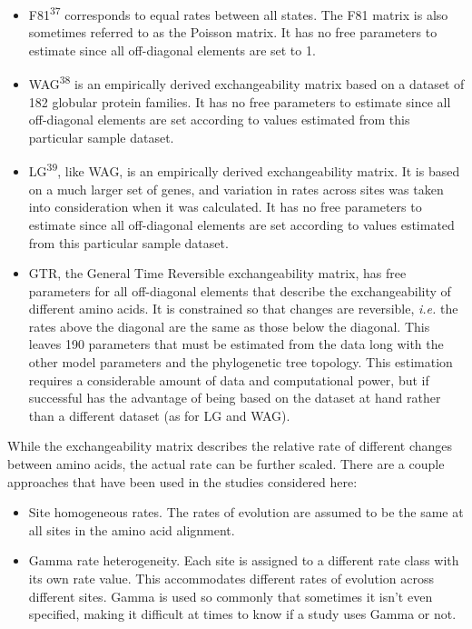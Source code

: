 \documentclass[]{article}
\begin{document}
\begin{itemize}
\item
  F81\textsuperscript{37} corresponds to equal rates between all states.
  The F81 matrix is also sometimes referred to as the Poisson matrix. It
  has no free parameters to estimate since all off-diagonal elements are
  set to 1.
\item
  WAG\textsuperscript{38} is an empirically derived exchangeability
  matrix based on a dataset of 182 globular protein families. It has no
  free parameters to estimate since all off-diagonal elements are set
  according to values estimated from this particular sample dataset.
\item
  LG\textsuperscript{39}, like WAG, is an empirically derived
  exchangeability matrix. It is based on a much larger set of genes, and
  variation in rates across sites was taken into consideration when it
  was calculated. It has no free parameters to estimate since all
  off-diagonal elements are set according to values estimated from this
  particular sample dataset.
\item
  GTR, the General Time Reversible exchangeability matrix, has free
  parameters for all off-diagonal elements that describe the
  exchangeability of different amino acids. It is constrained so that
  changes are reversible, \emph{i.e.} the rates above the diagonal are
  the same as those below the diagonal. This leaves 190 parameters that
  must be estimated from the data long with the other model parameters
  and the phylogenetic tree topology. This estimation requires a
  considerable amount of data and computational power, but if successful
  has the advantage of being based on the dataset at hand rather than a
  different dataset (as for LG and WAG).
\end{itemize}

While the exchangeability matrix describes the relative rate of
different changes between amino acids, the actual rate can be further
scaled. There are a couple approaches that have been used in the studies
considered here:

\begin{itemize}
\item
  Site homogeneous rates. The rates of evolution are assumed to be the
  same at all sites in the amino acid alignment.
\item
  Gamma rate heterogeneity. Each site is assigned to a different rate
  class with its own rate value. This accommodates different rates of
  evolution across different sites. Gamma is used so commonly that
  sometimes it isn't even specified, making it difficult at times to
  know if a study uses Gamma or not.
\end{itemize}
\end{document}
